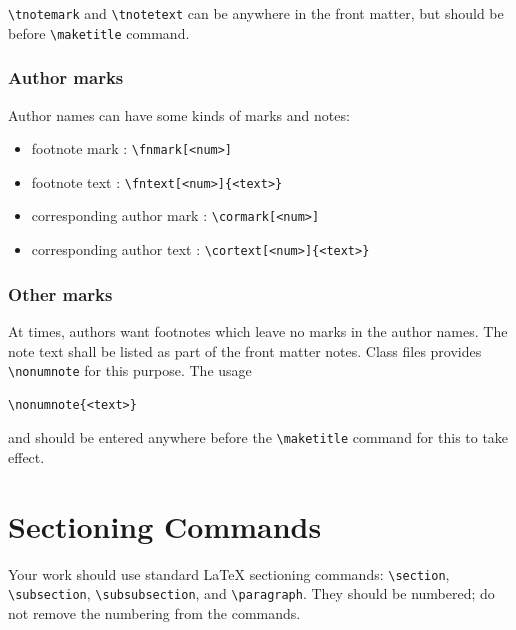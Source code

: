 \documentclass[
]{ceurart}
\begin{document}
\verb|\tnotemark| and \verb|\tnotetext| can be anywhere in
the front matter, but should be before \verb|\maketitle| command.

\subsubsection{Author marks}

Author names can have some kinds of marks and notes:
\begin{itemize}
\item footnote mark : \verb|\fnmark[<num>]|
\item footnote text : \verb|\fntext[<num>]{<text>}|
\item corresponding author mark : \verb|\cormark[<num>]|
\item corresponding author text : \verb|\cortext[<num>]{<text>}|
\end{itemize}

\subsubsection{Other marks}

At times, authors want footnotes which leave no marks in
the author names. The note text shall be listed as part of
the front matter notes. Class files provides
\verb|\nonumnote| for this purpose. The usage
\begin{lstlisting}
\nonumnote{<text>}
\end{lstlisting}
and should be entered anywhere before the \verb|\maketitle|
command for this to take effect. 

\section{Sectioning Commands}

Your work should use standard \LaTeX{} sectioning commands:
\verb|\section|, \verb|\subsection|,
\verb|\subsubsection|, and
\verb|\paragraph|. They should be numbered; do not remove
the numbering from the commands.
\end{document}
